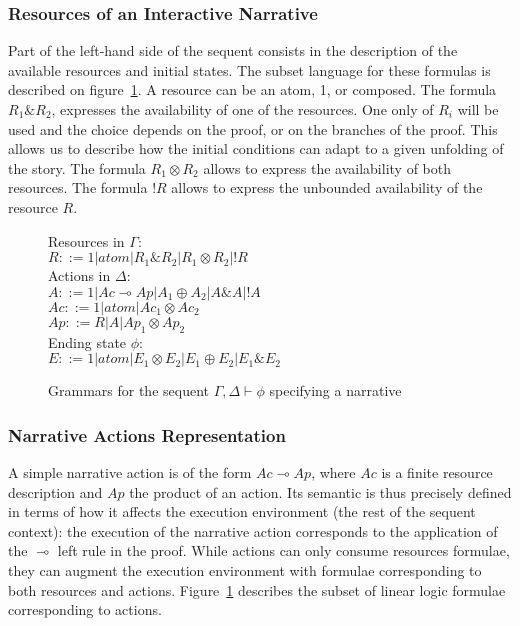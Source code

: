 \documentclass[runningheads,a4paper]{llncs}
\begin{document}
\subsubsection{Resources of an Interactive Narrative}
Part of the left-hand side of the sequent consists in the description of the available resources and initial states. The subset language for these formulas is described on figure~\ref{sequent_grammars}. A resource can be an atom, 1, or composed. The formula $R_{1}\&R_{2}$, expresses the availability of one of the resources. One only of $R_{i}$ will be used and the choice depends on the proof, or on the branches of the proof. This allows us to describe how the initial conditions can adapt to a given unfolding of the story. The formula $R_{1} \otimes R_{2}$ allows to express the availability of both resources. The formula $!R$ allows to express the unbounded availability of the resource $R$.
\begin{figure}
Resources in $\Gamma$:\\
$R::= 1| atom | R_{1}\&R_{2} | R_{1} \otimes R_{2} | !R $\\
Actions in $\Delta$:\\
$A::= 1 | Ac \multimap Ap | A_{1} \oplus A_{2} | A\& A | !A$\\
$Ac ::= 1 | atom | Ac_{1} \otimes Ac_{2}$\\
$Ap::= R | A | Ap_{1} \otimes Ap_{2}$\\
Ending state $\phi$:\\
$E::= 1 | atom | E_{1} \otimes E_{2} | E_{1} \oplus E_{2} | E_{1} \& E_{2}$
\caption{Grammars for the sequent $\Gamma , \Delta \vdash \phi$ specifying a narrative\label{sequent_grammars}}
\end{figure}
\subsubsection{Narrative Actions Representation}
A simple narrative action is of the form $Ac \multimap Ap$, where $Ac$ is a finite resource description and $Ap$ the product of an action. Its semantic is thus precisely defined in terms of how it affects the execution environment (the rest of the sequent context): the execution of the narrative action corresponds to the application of the $\multimap$ left rule in the proof. While actions can only consume resources formulae, they can augment the execution environment with formulae corresponding to both resources and actions. Figure~\ref{sequent_grammars} describes the subset of linear logic formulae corresponding to actions.
\end{document}
